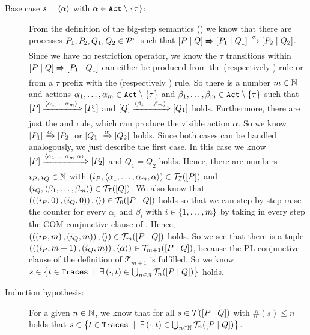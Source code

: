\begin{prf}
\begin{description}
\item[Base case $s=\langle\alpha\rangle$ with $\alpha\in\actions\setminus\set{\tau}$:] From the definition of the big-step semantics () we know that there are processes $P_1,P_2,Q_1,Q_2\in\mathcal P^{\pi}$ such that $\left[P \mid Q\right]\xRightarrow{}\left[P_1 \mid Q_1\right]\xrightarrow{\alpha}\left[P_2 \mid Q_2\right]$. Since we have no restriction operator, we know the $\tau$ transitions within $\left[P \mid Q\right]\xRightarrow{}\left[P_1 \mid Q_1\right]$ can either be produced from the \ecoml{} (respectively \ecomr{}) rule or from a $\tau$ prefix with the \eparl{} (respectively \eparr{}) rule. So there is a number $m\in\mathbb N$ and actions $\alpha_1,\ldots,\alpha_m\in\actions\setminus\set{\tau}$ and $\beta_1,\ldots,\beta_m\in\actions\setminus\set{\tau}$ such that $\left[P\right]\xRightarrow{\langle\alpha_1,\ldots,\alpha_m\rangle}\left[P_1\right]$ and $\left[Q\right]\xRightarrow{\langle\beta_1,\ldots,\beta_m\rangle}\left[Q_1\right]$ holds. Furthermore, there are just the \eparl{} and \eparr{} rule, which can produce the visible action $\alpha$. So we know $\left[P_1\right]\xrightarrow{\alpha}\left[P_2\right]$ or $\left[Q_1\right]\xrightarrow{\alpha}\left[Q_2\right]$ holds. Since both cases can be handled analogously, we just describe the first case. In this case we know $\left[P\right]\xRightarrow{\langle\alpha_1,\ldots,\alpha_m, \alpha\rangle}\left[P_2\right]$ and $Q_1=Q_2$ holds. Hence, there are numbers $i_P,i_Q\in\mathbb N$ with $\left(i_P,\langle\alpha_1,\ldots,\alpha_m,\alpha\rangle\right)\in\mathcal{T_I}(\left[P\right])$ and $\left(i_Q,\langle\beta_1,\ldots,\beta_m\rangle\right)\in\mathcal{T_I}(\left[Q\right])$. We also know that $\left(\left(\left(i_P,0\right),\left(i_Q,0\right)\right),\langle\rangle\right)\in\mathcal T_{0}(\left[P \mid Q\right])$ holds so that we can step by step raise the counter for every $\alpha_i$ and $\beta_i$ with $i\in\set{1,\ldots,m}$ by taking in every step the COM conjunctive clause of . Hence, $\left(\left(\left(i_P,m\right),\left(i_Q,m\right)\right),\langle\rangle\right)\in\mathcal T_{m}(\left[P \mid Q\right])$ holds. So we see that there is a tuple $\left(\left(\left(i_P,m+1\right),\left(i_Q,m\right)\right),\langle\alpha\rangle\right)\in\mathcal T_{m+1}(\left[P \mid Q\right])$, because the PL conjunctive clause of the definition of $\mathcal T_{m+1}$ is fulfilled. So we know $s\in\set[\exists\left(\cdot,t\right)\in\bigcup_{n\in\N}\tracesI{n}{P}{Q}]{t\in\tr}$ holds.

\item[Induction hypothesis:] For a given $n\in\mathbb N$, we know that for all $s\in\traces[\procpar{P}{Q}]$ with $\#(s)\leq{}n$ holds that $s\in\set[\exists\left(\cdot,t\right)\in\bigcup_{n\in\N}\tracesI{n}{P}{Q}]{t\in\tr}$.


\end{description}
\end{prf}

